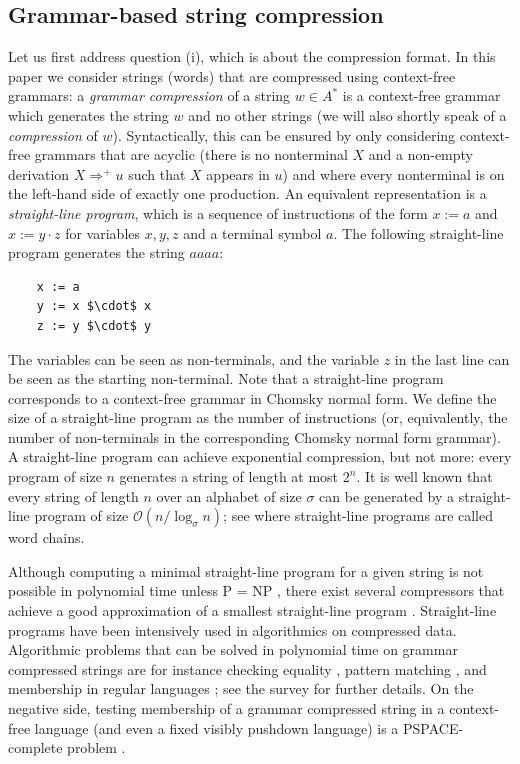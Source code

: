 \documentclass[a4paper,UKenglish,cleveref, autoref, thm-restate]{lipics-v2021}
\begin{document}
\subsection{Grammar-based string compression}
Let us first address question (i), which is about the compression format. In this paper we consider strings (words) that are compressed using context-free grammars: a \emph{grammar compression} of a string $w \in A^*$ is a context-free grammar which generates the string $w$ and no other strings (we will also shortly speak of a 
\emph{compression} of $w$). Syntactically, this can be ensured by only considering context-free grammars that are acyclic (there is no nonterminal $X$ and a non-empty derivation $X \Rightarrow^+ u$ such that $X$ appears in $u$) and where every nonterminal is on the left-hand side of exactly one production.
  An equivalent representation is a \emph{straight-line program}, which is a sequence of instructions 
  of the form $x := a$ and $x := y \cdot z$ for variables $x,y,z$ and a terminal symbol $a$.
 The following straight-line program generates the string $aaaa$:
\begin{lstlisting}
    x := a
    y := x $\cdot$ x
    z := y $\cdot$ y
\end{lstlisting}
The variables can be seen as non-terminals, and the variable $z$ in the last line can be seen as the starting non-terminal. 
Note that a straight-line program corresponds to a context-free grammar in Chomsky normal form. We define the size of 
a straight-line program as the number of instructions (or, equivalently, the number of non-terminals in the corresponding Chomsky
normal form grammar).
A straight-line  program can achieve exponential compression, but not more: every program of size $n$ generates a string of length at most $2^n$.
It is well known that every string of length $n$ over an alphabet of size $\sigma$ can be generated by a straight-line program of size
$\mathcal{O}(n / \log_\sigma n)$; see \cite[Proposition~3.1]{BerstelB87} where straight-line programs are called word chains.

Although computing a minimal straight-line  program for a given string is not possible in polynomial time unless \textsf{P} = \textsf{NP} \cite[Theorem~1]{CLLLPPSS05},
there exist several compressors that achieve a good approximation of a smallest straight-line program \cite{CLLLPPSS05,Jez15approx,Ryt03}.
Straight-line programs have been intensively used in algorithmics on compressed data. 
Algorithmic problems that can be solved in polynomial time on grammar compressed strings are for instance
checking equality \cite{HirshfeldJM94,MehlhornSU94,Pla94}, pattern matching \cite{KRS95,Jez15}, and membership in regular languages \cite{PlandowskiR99}; see the survey \cite{Loh12survey} for further details.
On the negative side, testing membership of a grammar compressed string in a context-free language (and even a fixed
visibly pushdown language) is a \textsf{PSPACE}-complete problem \cite[Theorem 9]{Lohrey11}.
\end{document}
